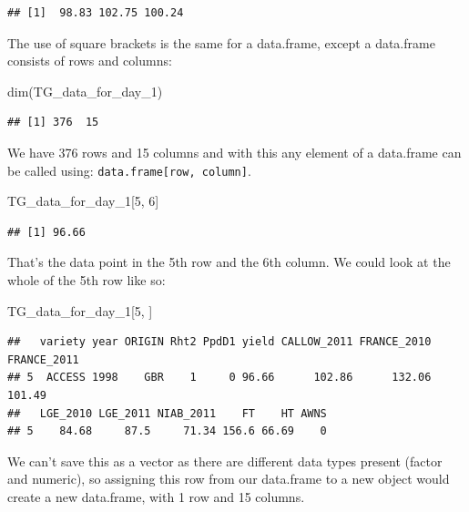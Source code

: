 \documentclass[
]{book}
\newenvironment{Shaded}{\begin{snugshade}}{\end{snugshade}}
\newcommand{\DecValTok}[1]{\textcolor[rgb]{0.00,0.00,0.81}{#1}}
\newcommand{\FunctionTok}[1]{\textcolor[rgb]{0.00,0.00,0.00}{#1}}
\newcommand{\NormalTok}[1]{#1}
\begin{document}
\begin{verbatim}
## [1]  98.83 102.75 100.24
\end{verbatim}

The use of square brackets is the same for a data.frame, except a data.frame consists of rows and columns:

\begin{Shaded}
\begin{Highlighting}[]
\FunctionTok{dim}\NormalTok{(TG\_data\_for\_day\_1)}
\end{Highlighting}
\end{Shaded}

\begin{verbatim}
## [1] 376  15
\end{verbatim}

We have 376 rows and 15 columns and with this any element of a data.frame can be called using: \texttt{data.frame{[}row,\ column{]}}.

\begin{Shaded}
\begin{Highlighting}[]
\NormalTok{TG\_data\_for\_day\_1[}\DecValTok{5}\NormalTok{, }\DecValTok{6}\NormalTok{]}
\end{Highlighting}
\end{Shaded}

\begin{verbatim}
## [1] 96.66
\end{verbatim}

That's the data point in the 5th row and the 6th column. We could look at the whole of the 5th row like so:

\begin{Shaded}
\begin{Highlighting}[]
\NormalTok{TG\_data\_for\_day\_1[}\DecValTok{5}\NormalTok{, ]}
\end{Highlighting}
\end{Shaded}

\begin{verbatim}
##   variety year ORIGIN Rht2 PpdD1 yield CALLOW_2011 FRANCE_2010 FRANCE_2011
## 5  ACCESS 1998    GBR    1     0 96.66      102.86      132.06      101.49
##   LGE_2010 LGE_2011 NIAB_2011    FT    HT AWNS
## 5    84.68     87.5     71.34 156.6 66.69    0
\end{verbatim}

We can't save this as a vector as there are different data types present (factor and numeric), so assigning this row from our data.frame to a new object would create a new data.frame, with 1 row and 15 columns.
\end{document}
